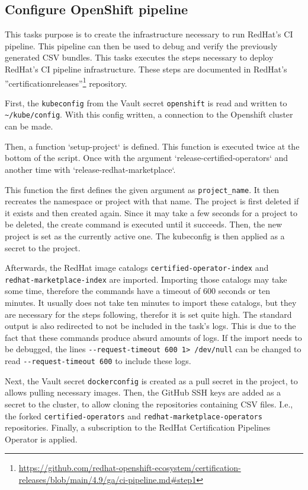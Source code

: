 \subsection{Configure OpenShift pipeline}\label{subsec:configure-openshift-pipeline}

This tasks purpose is to create the infrastructure necessary to run RedHat's CI pipeline.
This pipeline can then be used to debug and verify the previously generated CSV bundles.
This tasks executes the steps necessary to deploy RedHat's CI pipeline infrastructure.
These steps are documented in RedHat's ''certification\-releases''\footnote{\url{https://github.com/redhat-openshift-ecosystem/certification-releases/blob/main/4.9/ga/ci-pipeline.md#step1}} repository.

First, the \verb|kubeconfig| from the Vault secret \verb|openshift| is read and written to \verb|~/kube/config|.
With this config written, a connection to the Openshift cluster can be made.

Then, a function `setup-project` is defined.
This function is executed twice at the bottom of the script.
Once with the argument `release-certified-operators` and another time with `release-redhat-marketplace`.

This function the first defines the given argument as \verb|project_name|.
It then recreates the namespace or project with that name.
The project is first deleted if it exists and then created again.
Since it may take a few seconds for a project to be deleted, the create command is executed until it succeeds.
Then, the new project is set as the currently active one.
The kubeconfig is then applied as a secret to the project.

Afterwards, the RedHat image catalogs \verb|certified-operator-index| and \\ \verb|redhat-marketplace-index| are imported.
Importing those catalogs may take some time, therefore the commands have a timeout of 600 seconds or ten minutes.
It usually does not take ten minutes to import these catalogs, but they are necessary for the steps following, therefor it is set quite high.
The standard output is also redirected to not be included in the task's logs.
This is due to the fact that these commands produce absurd amounts of logs.
If the import needs to be debugged, the lines \verb|--request-timeout 600 1> /dev/null| can be changed to read \verb|--request-timeout 600| to include these logs.

Next, the Vault secret \verb|dockerconfig| is created as a pull secret in the project, to allows pulling necessary images.
Then, the GitHub SSH keys are added as a secret to the cluster, to allow cloning the repositories containing CSV files.
I.e., the forked \verb|certified-operators| and \verb|redhat-marketplace-operators| repositories.
Finally, a subscription to the RedHat Certification Pipelines Operator is applied.
